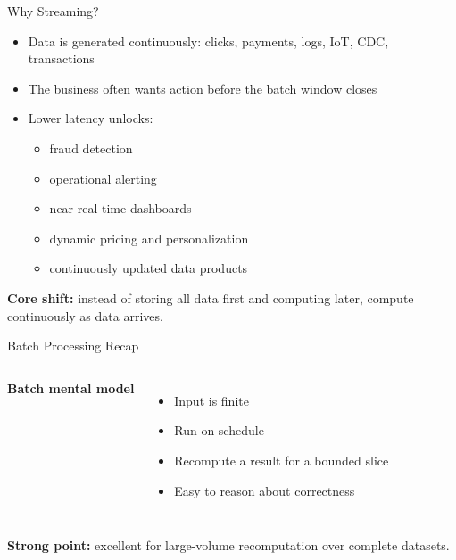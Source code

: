 \documentclass[aspectratio=169]{beamer}
\begin{document}
\begin{frame}{Why Streaming?}
\begin{itemize}
    \item Data is generated continuously: clicks, payments, logs, IoT, CDC, transactions
    \item The business often wants action before the batch window closes
    \item Lower latency unlocks:
    \begin{itemize}
        \item fraud detection
        \item operational alerting
        \item near-real-time dashboards
        \item dynamic pricing and personalization
        \item continuously updated data products
    \end{itemize}
\end{itemize}

\vspace{0.3cm}
\textbf{Core shift:} instead of storing all data first and computing later, compute continuously as data arrives.
\end{frame}

\begin{frame}{Batch Processing Recap}
\begin{columns}[T]
\textbf{Batch mental model}
\begin{itemize}
    \item Input is finite
    \item Run on schedule
    \item Recompute a result for a bounded slice
    \item Easy to reason about correctness
\end{itemize}

\end{columns}

\vspace{0.3cm}
\textbf{Strong point:} excellent for large-volume recomputation over complete datasets.
\end{frame}
\end{document}
